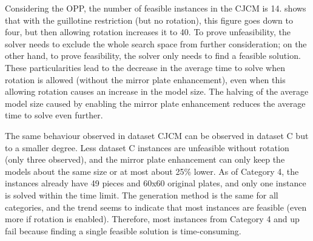 Considering the OPP, the number of feasible instances in the CJCM is 14.
 shows that with the guillotine restriction (but no rotation), this figure goes down to four, but then allowing rotation increases it to 40.
To prove unfeasibility, the solver needs to exclude the whole search space from further consideration; on the other hand, to prove feasibility, the solver only needs to find a feasible solution.
These particularities lead to the decrease in the average time to solve when rotation is allowed (without the mirror plate enhancement), even when this allowing rotation causes an increase in the model size.
The halving of the average model size caused by enabling the mirror plate enhancement reduces the average time to solve even further.

The same behaviour observed in dataset CJCM can be observed in dataset C but to a smaller degree.
Less dataset C instances are unfeasible without rotation (only three observed), and the mirror plate enhancement can only keep the models about the same size or at most about 25\% lower.
As of Category 4, the instances already have 49 pieces and 60x60 original plates, and only one instance is solved within the time limit.
The generation method is the same for all categories, and the trend seems to indicate that most instances are feasible (even more if rotation is enabled).
Therefore, most instances from Category 4 and up fail because finding a single feasible solution is time-consuming.

